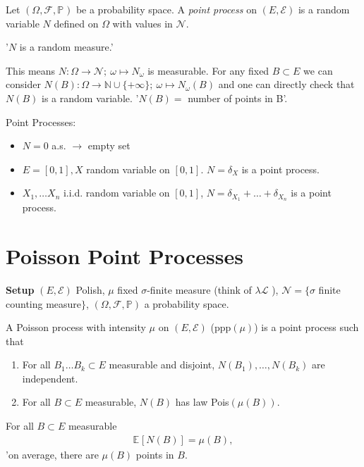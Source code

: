\begin{defn}
	Let $(\Omega, \mathcal{F}, \mathbb{P}_{}) $ be a probability space. A \emph{point process} on $(E, \mathcal{E})$ is a random variable $N$ defined on $\Omega $ with values in $\mathcal{N}$.
\end{defn}

'$N$ is a random measure.'

This means $N: \Omega \to \mathcal{N};\ \omega \mapsto N_{\omega } $ is measurable. For any fixed $B \subset E$ we can consider $N(B): \Omega \to \mathbb{N}\cup \{+\infty\};\ \omega \mapsto N_{\omega }(B)$ and one can directly check that $N(B)$ is a random variable. 
'$N(B)=$ number of points in B'.

\begin{ex}[] Point Processes:
\begin{itemize}
	\item $N=0$ a.s.  $\to$ empty set
	\item $E=[0,1], X$ random variable on  $[0,1]$.  $N=\delta_X$ is a point process.
	\item $X_1, \ldots X_n$ i.i.d. random variable on $[0,1]$,  $N=\delta_{X_1}+ \ldots +\delta_{X_n}$ is a point process.
\end{itemize}
\end{ex}

\section{Poisson Point Processes}
\textbf{Setup} $(E, \mathcal{E})$ Polish, $\mu$ fixed $\sigma$-finite measure (think of $\lambda \mathcal{L}$ ), $\mathcal{N}=\{\sigma$ finite counting measure$\}$, $(\Omega, \mathcal{F}, \mathbb{P} )$ a probability space.

\begin{defn}
	A Poisson process with intensity $\mu$ on $(E, \mathcal{E})$ (ppp$(\mu)$) is a point process such that
 \begin{enumerate}
	 \item For all $B_1 \ldots B_k \subset E$ measurable and disjoint, $N(B_1), \ldots ,N(B_k)$ are independent.
	 \item For all $B \subset E$ measurable, $N(B)$ has law Pois$(\mu(B))$.
\end{enumerate}
\end{defn}
\begin{rmk}[]
	For all $B \subset E$ measurable
	\begin{align}
		\mathbb{E}_{} \left[ N(B) \right] = \mu(B),
	\end{align}
	'on average, there are $\mu (B)$ points in $B$.
\end{rmk}

